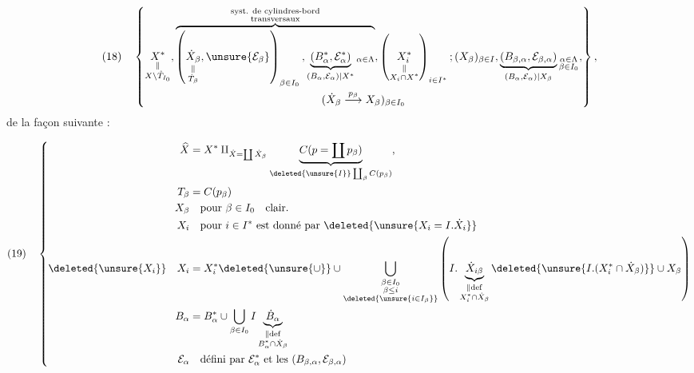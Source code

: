 \[
(18)\quad\left\{
\begin{gathered}
\underset{\substack{\parallel\\X\setminus\mathring T_{I_0}}}{X^*},
\overbrace{
\left(\underset{\substack{\parallel\\\dot T_\beta}}{\dot X_\beta},
\unsure{\mathcal E_\beta}\right)_{\beta\in I_0},
\underbrace{(B_\alpha^*,\mathcal E_\alpha^*)}
_{(B_\alpha,\mathcal E_\alpha)|X^*}{}_{\alpha\in\Lambda}
}^{\substack{\text{syst. de cylindres-bord}\\\text{transversaux}}},
\left(\underset{\substack{\parallel\\X_i\cap X^*}}{X_i^*}\right)_{i\in I^*};
(X_\beta)_{\beta\in I},
\underbrace{(B_{\beta,\alpha},\mathcal E_{\beta,\alpha})}
_{(B_\alpha,\mathcal E_\alpha)|X_\beta}
{}_{\substack{\alpha\in\Lambda\\\beta\in I_0}},\\
(\dot X_\beta\overset{p_\beta}\longrightarrow X_\beta)_{\beta\in I_0}
\end{gathered}\right\},
\]
de la façon suivante :

\[
(19)\quad\left\{
\begin{aligned}
\widehat X&=X^*\amalg_{\dot X=\coprod\dot X_\beta}
\underbrace{C(p=\coprod p_\beta)}
_{\deleted{\unsure{I}}\coprod_\beta C(p_\beta)},\\
T_\beta&=C(p_\beta)\\
X_\beta&\quad\text{pour }\beta\in I_0\quad\text{clair}.\\
X_i&\quad\text{pour }i\in I^*\text{ est donné par }
\deleted{\unsure{X_i=I.\dot X_i}}\\
\deleted{\unsure{X_i}}\quad X_i&=X_i^*\deleted{\unsure{\cup}}
\cup\bigcup_{\substack{\beta\in I_0\\\beta\le i\\\deleted{\unsure{i\in I_\beta}}}}
\left(I.\underbrace{\dot X_{i\beta}}
_{\substack{\parallel\mathrm{def}\\X_i^*\cap\dot X_\beta}}
\deleted{\unsure{I.(X_i^*\cap\dot X_\beta)}}\cup X_\beta\right)\\
B_\alpha&=B_\alpha^*\cup\bigcup_{\beta\in I_0}
I\underbrace{\dot B_\alpha}_{\substack{\parallel\mathrm{def}\\B_\alpha^*\cap\dot X_\beta}}\\
\mathcal E_\alpha&\quad\text{défini par }\mathcal E_\alpha^*
\text{ et les }(B_{\beta,\alpha},\mathcal E_{\beta,\alpha})
\end{aligned}\right.
\]

